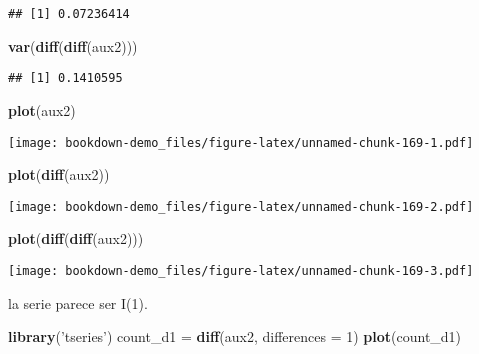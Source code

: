 \documentclass[]{book}
\newenvironment{Shaded}{\begin{snugshade}}{\end{snugshade}}
\newcommand{\KeywordTok}[1]{\textcolor[rgb]{0.13,0.29,0.53}{\textbf{#1}}}
\newcommand{\DataTypeTok}[1]{\textcolor[rgb]{0.13,0.29,0.53}{#1}}
\newcommand{\DecValTok}[1]{\textcolor[rgb]{0.00,0.00,0.81}{#1}}
\newcommand{\StringTok}[1]{\textcolor[rgb]{0.31,0.60,0.02}{#1}}
\newcommand{\NormalTok}[1]{#1}
\theoremstyle{definition}
\theoremstyle{definition}
\theoremstyle{definition}
\theoremstyle{remark}
\begin{document}
\begin{verbatim}
## [1] 0.07236414
\end{verbatim}

\begin{Shaded}
\begin{Highlighting}[]
\KeywordTok{var}\NormalTok{(}\KeywordTok{diff}\NormalTok{(}\KeywordTok{diff}\NormalTok{(aux2)))}
\end{Highlighting}
\end{Shaded}

\begin{verbatim}
## [1] 0.1410595
\end{verbatim}

\begin{Shaded}
\begin{Highlighting}[]
\KeywordTok{plot}\NormalTok{(aux2)}
\end{Highlighting}
\end{Shaded}

\texttt{[image: bookdown-demo\_files/figure-latex/unnamed-chunk-169-1.pdf]}

\begin{Shaded}
\begin{Highlighting}[]
\KeywordTok{plot}\NormalTok{(}\KeywordTok{diff}\NormalTok{(aux2))}
\end{Highlighting}
\end{Shaded}

\texttt{[image: bookdown-demo\_files/figure-latex/unnamed-chunk-169-2.pdf]}

\begin{Shaded}
\begin{Highlighting}[]
\KeywordTok{plot}\NormalTok{(}\KeywordTok{diff}\NormalTok{(}\KeywordTok{diff}\NormalTok{(aux2)))}
\end{Highlighting}
\end{Shaded}

\texttt{[image: bookdown-demo\_files/figure-latex/unnamed-chunk-169-3.pdf]}

la serie parece ser I(1).

\begin{Shaded}
\begin{Highlighting}[]
\KeywordTok{library}\NormalTok{(}\StringTok{'tseries'}\NormalTok{)}
\NormalTok{count_d1 =}\StringTok{ }\KeywordTok{diff}\NormalTok{(aux2, }\DataTypeTok{differences =} \DecValTok{1}\NormalTok{)}
\KeywordTok{plot}\NormalTok{(count_d1)}
\end{Highlighting}
\end{Shaded}
\end{document}
